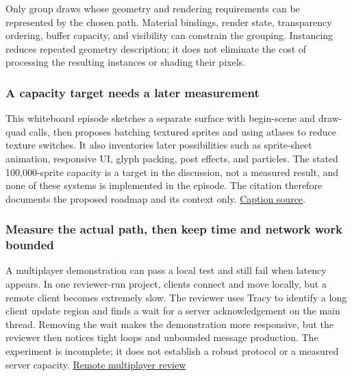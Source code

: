 Only group draws whose geometry and rendering requirements can be represented by the chosen path. Material bindings, render state, transparency ordering, buffer capacity, and visibility can constrain the grouping. Instancing reduces repeated geometry description; it does not eliminate the cost of processing the resulting instances or shading their pixels.

\subsubsection{A capacity target needs a later measurement}\label{06-engine-ii-ch026-a-capacity-target-needs-a-later-measurement}

\hypertarget{06-engine-ii-ch026-a-capacity-target-needs-a-later-measurement}{}

This whiteboard episode sketches a separate  surface with begin-scene and draw-quad calls, then proposes batching textured sprites and using atlases to reduce texture switches. It also inventories later possibilities such as sprite-sheet animation, responsive UI, glyph packing, post effects, and particles. The stated 100,000-sprite capacity is a target in the discussion, not a measured result, and none of these systems is implemented in the episode. The citation therefore documents the proposed roadmap and its context only. \href{https://www.youtube.com/watch?v=ULO8JhM9FsQ}{Caption source}.

\subsubsection{Measure the actual path, then keep time and network work bounded}\label{06-engine-ii-ch026-measure-the-actual-path-then-keep-time-and-network-work-bounded}

\hypertarget{06-engine-ii-ch026-measure-the-actual-path-then-keep-time-and-network-work-bounded}{}

A multiplayer demonstration can pass a local test and still fail when latency appears. In one reviewer-run project, clients connect and move locally, but a remote client becomes extremely slow. The reviewer uses Tracy to identify a long client update region and finds a wait for a server acknowledgement on the main thread. Removing the wait makes the demonstration more responsive, but the reviewer then notices tight loops and unbounded message production. The experiment is incomplete; it does not establish a robust protocol or a measured server capacity. \href{https://www.youtube.com/watch?v=lAXOmE481j4&t=17m3s}{Remote multiplayer review}

